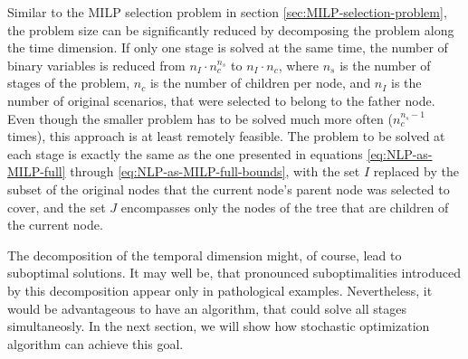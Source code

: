 Similar to the MILP selection problem in section \ref{sec:MILP-selection-problem}, the problem size can be significantly reduced by decomposing the problem along the time dimension. If only one stage is solved at the same time, the number of binary variables is reduced from $n_I\cdot n_c^{n_s}$ to $n_I\cdot n_c$, where $n_s$ is the number of stages of the problem, $n_c$ is the number of children per node, and $n_I$ is the number of original scenarios, that were selected to belong to the father node. Even though the smaller problem has to be solved much more often ($n_c^{n_s-1}$ times), this approach is at least remotely feasible. The problem to be solved at each stage is exactly the same as the one presented in equations \ref{eq:NLP-as-MILP-full} through \ref{eq:NLP-as-MILP-full-bounds}, with the set $I$ replaced by the subset of the original nodes that the current node's parent node was selected to cover, and the set $J$ encompasses only the nodes of the tree that are children of the current node.

The decomposition of the temporal dimension might, of course, lead to suboptimal solutions. It may well be, that pronounced suboptimalities introduced by this decomposition appear only in pathological examples. Nevertheless, it would be advantageous to have an algorithm, that could solve all stages simultaneosly. In the next section, we will show how stochastic optimization algorithm can achieve this goal.
